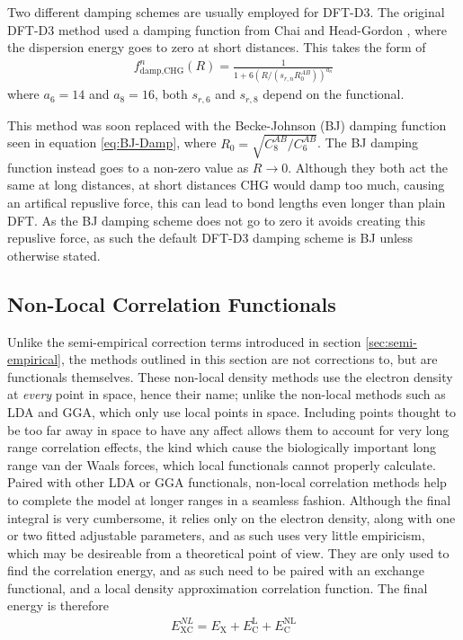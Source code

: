 \documentclass[10pt,a4paper,twocolumn,twoside]{extarticle}
\begin{document}
	Two different damping schemes are usually employed for DFT-D3. The original DFT-D3 method used a damping function from Chai and Head-Gordon \cite{Chai-Gordon-Damp}, where the dispersion energy goes to zero at short distances. 
	This takes the form of 
	\begin{align}
		f^n_\text{damp,CHG}(R) = \frac{1}{1 + 6(R/(s_{r,n}R_0^{AB}))^{a_n}} 
	\end{align}
	where $a_6 = 14$ and $a_8 = 16$, both $s_{r,6}$ and $s_{r,8}$ depend on the functional. 
	
	This method was soon replaced with the Becke-Johnson (BJ) damping function\cite{BJ-Damp} seen in equation \ref{eq:BJ-Damp}, where $R_0 = \sqrt{C_8^{AB}/C_6^{AB}}$. The BJ damping function instead goes to a non-zero value as $R \rightarrow 0$. Although they both act the same at long distances, at short distances CHG would damp too much, causing an artifical repuslive force, this can lead to bond lengths even longer than plain DFT. As the BJ damping scheme does not go to zero it avoids creating this repuslive force, as such the default DFT-D3 damping scheme is BJ unless otherwise stated.



	\subsection{Non-Local Correlation Functionals}
	\label{sec:NL}
	Unlike the semi-empirical correction terms introduced in section \ref{sec:semi-empirical}, the methods outlined in this section are not corrections to, but are functionals themselves. These non-local density methods use the electron density at \emph{every} point in space, hence their name; unlike the non-local methods such as LDA and GGA, which only use local points in space. Including points thought to be too far away in space to have any affect allows them to account for very long range correlation effects, the kind which cause the biologically important long range van der Waals forces, which local functionals cannot properly calculate. Paired with other LDA or GGA functionals, non-local correlation methods help to complete the model at longer ranges in a seamless fashion. Although the final integral is very cumbersome, it relies only on the electron density, along with one or two fitted adjustable parameters, and as such uses very little empiricism, which may be desireable from a theoretical point of view. They are only used to find the correlation energy, and as such need to be paired with an exchange functional, and a local density approximation correlation function. The final energy is therefore
	\begin{align}
		E_\text{XC}^{NL} = E_\text{X} + E_\text{C}^\text{L} + E_\text{C}^\text{NL}
	\end{align} 
\end{document}
